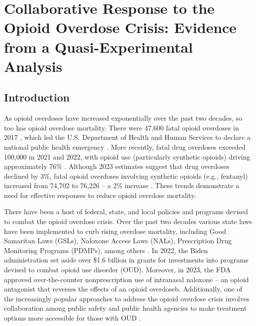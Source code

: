 \chapter{Collaborative Response to the Opioid Overdose Crisis: Evidence from a Quasi-Experimental Analysis}

\section{\centering Introduction}
As opioid overdoses have increased exponentially over the past two decades, so too has opioid overdose mortality. There were 47,600 fatal opioid overdoses in 2017 \parencite{wilson_drug_2020}, which led the U.S. Department of Health and Human Services to declare a national public health emergency \parencite{johnson_trump_2017}. More recently, fatal drug overdoses exceeded 100,000 in 2021 and 2022, with opioid use (particularly synthetic opioids) driving approximately 76\% \parencite{center_for_disease_control_and_prevention_national_2023}. Although 2023 estimates suggest that drug overdoses declined by 3\%, fatal opioid overdoses involving synthetic opioids (e.g., fentanyl) increased from 74,702 to 76,226 -- a 2\% increase \parencite{center_for_disease_control_and_prevention_us_2024}. These trends demonstrate a need for effective responses to reduce opioid overdose mortality.

There have been a host of federal, state, and local policies and programs devised to combat the opioid overdose crisis. Over the past two decades various state laws have been implemented to curb rising overdose mortality, including Good Samaritan Laws (GSLs), Naloxone Access Laws (NALs), Prescription Drug Monitoring Programs (PDMPs), among others \parencite{haegerich_evidence_2019}. In 2022, the Biden administration set aside over \$1.6 billion in grants for investments into programs devised to combat opioid use disorder (OUD)\parencite{us_department_of_health_and_human_services_biden-harris_2022}. Moreover, in 2023, the FDA approved over-the-counter nonprescription use of intranasal naloxone -- an opioid antagonist that reverses the effects of an opioid overdoseb\parencite{us_food_and_drug_administration_fda_2023}. Additionally, one of the increasingly popular approaches to address the opioid overdose crisis involves collaboration among public safety and public health agencies to make treatment options more accessible for those with OUD \parencite{yatsco_developing_2020}. 

